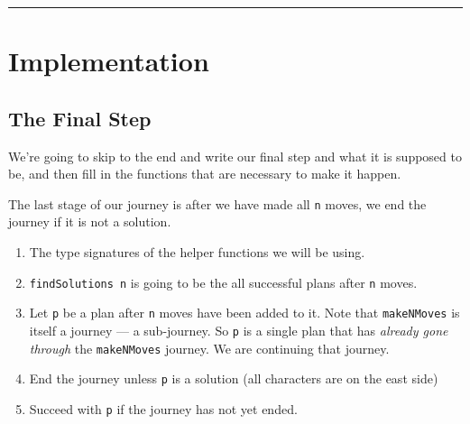 \documentclass[]{article}
\newenvironment{Shaded}{}{}
\newcommand{\KeywordTok}[1]{\textcolor[rgb]{0.00,0.44,0.13}{\textbf{{#1}}}}
\newcommand{\DataTypeTok}[1]{\textcolor[rgb]{0.56,0.13,0.00}{{#1}}}
\newcommand{\CommentTok}[1]{\textcolor[rgb]{0.38,0.63,0.69}{\textit{{#1}}}}
\newcommand{\OtherTok}[1]{\textcolor[rgb]{0.00,0.44,0.13}{{#1}}}
\newcommand{\FunctionTok}[1]{\textcolor[rgb]{0.02,0.16,0.49}{{#1}}}
\newcommand{\NormalTok}[1]{{#1}}
\begin{document}
\begin{center}\rule{0.5\linewidth}{\linethickness}\end{center}

\section{Implementation}\label{implementation}

\subsection{The Final Step}\label{the-final-step}

We're going to skip to the end and write our final step and what it is
supposed to be, and then fill in the functions that are necessary to
make it happen.

The last stage of our journey is after we have made all \texttt{n}
moves, we end the journey if it is not a solution.

\begin{Shaded}
\end{Shaded}

\begin{enumerate}
\def\labelenumi{\arabic{enumi}.}
\tightlist
\item
  The type signatures of the helper functions we will be using.
\item
  \texttt{findSolutions\ n} is going to be the all successful plans
  after \texttt{n} moves.
\item
  Let \texttt{p} be a plan after \texttt{n} moves have been added to it.
  Note that \texttt{makeNMoves} is itself a journey --- a sub-journey.
  So \texttt{p} is a single plan that has \emph{already gone through}
  the \texttt{makeNMoves} journey. We are continuing that journey.
\item
  End the journey unless \texttt{p} is a solution (all characters are on
  the east side)
\item
  Succeed with \texttt{p} if the journey has not yet ended.
\end{enumerate}
\end{document}
